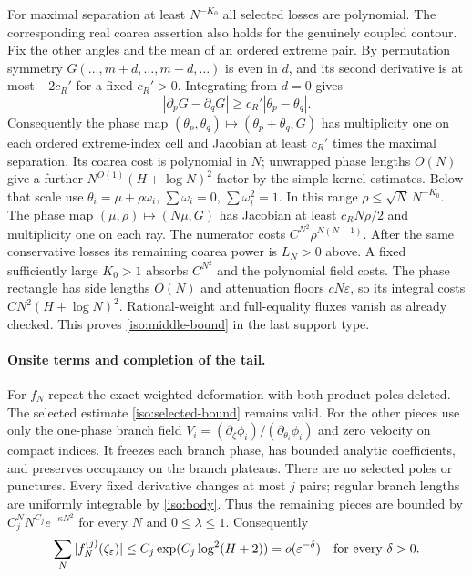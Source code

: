 \documentclass[11pt]{article}
\numberwithin{equation}{section}
\theoremstyle{definition}
\newcommand{\eps}{\varepsilon}
\begin{document}
For maximal separation at least $N^{-K_0}$ all selected losses are
polynomial. The corresponding real coarea assertion also holds for
the genuinely coupled contour. Fix the other angles and the mean of
an ordered extreme pair. By permutation symmetry
\(G(\ldots,m+d,\ldots,m-d,\ldots)\) is even in \(d\), and
its second derivative is at most \(-2c_R'\) for a fixed
\(c_R'>0\). Integrating from \(d=0\) gives
\[
 |\partial_pG-\partial_qG|
       \ge c_R'|\theta_p-\theta_q|.
\]
Consequently the phase map \((\theta_p,\theta_q)\mapsto
(\theta_p+\theta_q,G)\) has multiplicity one on each ordered
extreme-index cell and Jacobian at least \(c_R'\) times the maximal
separation. Its coarea cost is polynomial in \(N\); unwrapped
phase lengths \(O(N)\) give a further
\(N^{O(1)}(H+\log N)^2\) factor by the simple-kernel estimates.
Below that scale use $\theta_i=\mu+\rho\omega_i$,
$\sum\omega_i=0$, $\sum\omega_i^2=1$.
In this range $\rho\le\sqrt N\,N^{-K_0}$.
The phase map $(\mu,\rho)\mapsto(N\mu,G)$ has Jacobian at least
$c_RN\rho/2$ and multiplicity one on each ray. The numerator costs
$C^{N^2}\rho^{N(N-1)}$. After the same conservative losses its
remaining coarea power is $L_N>0$ above. A fixed sufficiently large
$K_0>1$ absorbs $C^{N^2}$ and the polynomial field costs. The phase
rectangle has side lengths $O(N)$ and attenuation floors $cN\eps$,
so its integral costs $CN^2(H+\log N)^2$. Rational-weight and
full-equality fluxes vanish as already checked. This proves
\eqref{iso:middle-bound} in the last support type.

\paragraph{Onsite terms and completion of the tail.}
For $f_N$ repeat the exact weighted deformation with both product poles
deleted. The selected estimate \eqref{iso:selected-bound} remains
valid. For the other pieces use only the one-phase branch field
$V_i=(\partial_\zeta\phi_i)/(\partial_{\theta_i}\phi_i)$ and zero
velocity on compact indices. It freezes each branch phase, has bounded
analytic coefficients, and preserves occupancy on the branch plateaus.
There are no selected poles or punctures. Every fixed derivative changes
at most $j$ pairs; regular branch lengths are uniformly integrable by
\eqref{iso:body}. Thus the remaining pieces are bounded by
$C_j^NN^{C_j}e^{-\kappa N^2}$ for every $N$ and
$0\le\lambda\le1$. Consequently
\begin{equation}
 \sum_N|f_N^{(j)}(\zeta_\eps)|
 \le C_j\exp(C_j\log^2(H+2))=o(\eps^{-\delta})
 \quad\hbox{for every }\delta>0.
 \label{iso:onsite-bound}
\end{equation}
\end{document}
